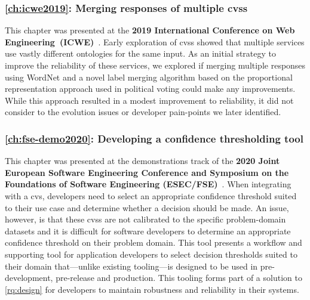 \subsubsection{\cref{ch:icwe2019}: Merging responses of multiple \glspl{cvs}} This chapter was presented at the \textbf{2019 International Conference on Web Engineering~(ICWE)}~\citep{Ohtake:2019vi}. Early exploration of \glspl{cvs} showed that multiple services use vastly different ontologies for the same input. As an initial strategy to improve the reliability of these services, we explored if merging multiple responses using WordNet \citep{WordNetMiller1995} and a novel label merging algorithm based on the proportional representation approach used in political voting could make any improvements. While this approach resulted in a modest improvement to reliability, it did not consider to the evolution issues or developer pain-points we later identified.

\subsubsection{\cref{ch:fse-demo2020}: Developing a confidence thresholding tool} This chapter was presented at the demonstrations track of the \textbf{2020 Joint European Software Engineering Conference and Symposium on the Foundations of Software Engineering (ESEC/FSE)}~\citep{Cummaudo:2020fse-demo}. When integrating with a \gls{cvs}, developers need to select an appropriate confidence threshold suited to their use case and determine whether a decision should be made. An issue, however, is that these \glspl{cvs} are not calibrated to the specific problem-domain datasets and it is difficult for software developers to determine an appropriate confidence threshold on their problem domain. This tool presents a workflow and supporting tool for application developers to select decision thresholds suited to their domain that---unlike existing tooling---is designed to be used in pre-development, pre-release and production. This tooling forms part of a solution to \ref{rq:design} for developers to maintain robustness and reliability in their systems.

